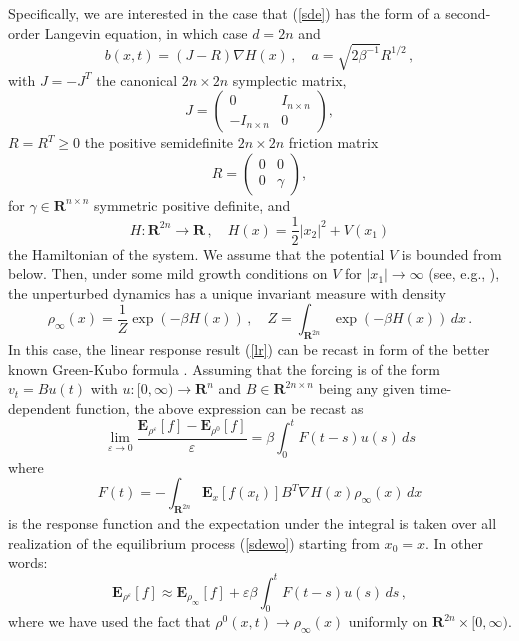 \documentclass[]{tMPH2e}
\newcommand{\R}{{\mathbf R}}
\newcommand{\eps}{\varepsilon}
\newcommand{\bE}{{\mathbf E}}
\begin{document}
Specifically, we are interested in the case that (\ref{sde}) has the form of a second-order Langevin equation, in which case $d=2n$ and 
\begin{equation}\label{eqn:langevin-1}
b(x,t) = (J-R)\nabla H(x)\,,\quad a = \sqrt{2\beta^{-1}}R^{1/2}\,,
\end{equation}
with $J=-J^{T}$ the canonical $2n\times 2n$ symplectic matrix,
\[
J = \left ( \begin{array}{cc} 
0 & I_{n\times n} \\ -I_{n\times n} &0
\end{array}\right),
\]
$R=R^{T}\ge 0$ the positive semidefinite $2n\times 2n$ friction matrix 
\[
R = \left ( \begin{array}{cc}
0 & 0 \\ 0 & \gamma
\end{array}\right),
\]
for $\gamma\in\R^{n\times n}$ symmetric positive definite, and 
\[
H\colon\R^{2n}\to\R\,,\quad H(x) = \frac{1}{2}|x_{2}|^{2} + V(x_{1})
\] 
the Hamiltonian of the system. We assume that the potential $V$ is bounded from below. Then, under some mild growth conditions on $V$ for $|x_{1}|\to\infty$ (see, e.g., \cite{mattingly2002}), the unperturbed dynamics has a unique invariant measure with density 
\[
\rho_{\infty}(x) = \frac{1}{Z}\exp(-\beta H(x))\,,\quad  Z=\int_{\R^{2n}}  \exp(-\beta H(x))\,dx\,.
\] 
In this case, the linear response result (\ref{lr}) can be recast in form of the better known Green-Kubo formula \cite{risken1996}. Assuming that the forcing is of the form $v_{t}=Bu(t)$ with $u\colon[0,\infty)\to\R^{n}$ and $B\in\R^{2n\times n}$ being any given time-dependent function, the above expression can be recast as 
\begin{equation}\label{GreenKubo}
\lim_{\eps\to 0}\frac{\bE_{\rho^{\eps}}[f] - \bE_{\rho^{0}}[f]}{\eps} = \beta\int_{0}^{t}F(t-s)u(s)\,ds
\end{equation}
where 
\[
F(t) = - \int_{\R^{2n}}\bE_{x}[f(x_{t})] B^{T}\nabla H(x)\rho_{\infty}(x)\,dx
\]
is the response function and the expectation under the integral is taken over all realization of the equilibrium process (\ref{sdewo}) starting from $x_{0}=x$. In other words: 
\[
\bE_{\rho^{\eps}}[f] \approx \bE_{\rho_{\infty}}[f] + \eps\beta\int_{0}^{t}F(t-s)u(s)\,ds\,,
\]
where we have used the fact that $\rho^{0}(x,t)\to \rho_{\infty}(x)$ uniformly on $\R^{2n}\times[0,\infty)$. 
 
\end{document}
